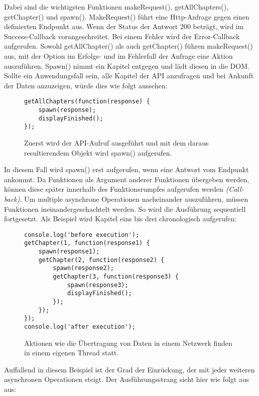 \noindent
Dabei sind die wichtigsten Funktionen makeRequest(), getAllChapters(), getChapter() und spawn(). MakeRequest() führt eine Http-Anfrage gegen einen definierten Endpunkt aus. Wenn der Status der Antwort 200 beträgt, wird im Success-Callback vorangeschreitet. Bei einem Fehler wird der Error-Callback aufgerufen. Sowohl getAllChapter() als auch getChapter() führen makeRequest() aus, mit der Option im Erfolgs- und im Fehlerfall der Anfrage eine Aktion auszuführen. Spawn() nimmt ein Kapitel entgegen und lädt diesen in die DOM. Sollte ein Anwendungsfall sein, alle Kapitel der API anzufragen und bei Ankunft der Daten anzuzeigen, würde dies wie folgt aussehen:

\begin{figure}[H]
\begin{lstlisting}[basicstyle=\small]
getAllChapters(function(response) {
    spawn(response);
    displayFinished();
});
\end{lstlisting}
\caption{Zuerst wird der API-Aufruf ausgeführt und mit dem daraus resultierendem Objekt wird spawn() aufgerufen.}
\end{figure}

\noindent
In diesem Fall wird spawn() erst aufgerufen, wenn eine Antwort vom Endpunkt ankommt. Da Funktionen als Argument anderer Funktionen übergeben werden, können diese \glqq{}später\grqq{} innerhalb des Funktionsrumpfes aufgerufen werden \textit{(\glqq{}Call-back\grqq{})}. Um multiple asynchrone Operationen nacheinander auszuführen, müssen Funktionen ineinandergeschachtelt werden. So wird die Ausführung sequentiell fortgesetzt. Als Beispiel wird Kapitel eins bis drei chronologisch aufgerufen:

\begin{figure}[H]
\begin{lstlisting}[basicstyle=\small]
console.log('before execution');
getChapter(1, function(response1) {
    spawn(response1);
    getChapter(2, function(response2) {
        spawn(response2);
        getChapter(3, function(response3) {
            spawn(response3);
            displayFinished();
        });
    });
});
console.log('after execution');
\end{lstlisting}
\caption{Aktionen wie die Übertragung von Daten in einem Netzwerk finden in einem eigenen Thread statt.}
\end{figure}

\noindent
Auffallend in diesem Beispiel ist der Grad der Einrückung, der mit jeder weiteren asynchronen Operationen steigt. Der Ausführungsstrang sieht hier wie folgt aus aus:

